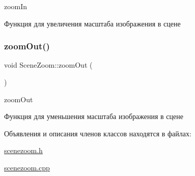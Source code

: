 zoom\+In 

Функция для увеличения масштаба изображения в сцене \mbox{\label{classSceneZoom_a9907761406dc1a9f1664429b4004a592}} 
\subsubsection{\texorpdfstring{zoom\+Out()}{zoomOut()}}
{\footnotesize\ttfamily void Scene\+Zoom\+::zoom\+Out (\begin{DoxyParamCaption}{ }\end{DoxyParamCaption})}



zoom\+Out 

Функция для уменьшения масштаба изображения в сцене 

Объявления и описания членов классов находятся в файлах\+:\begin{DoxyCompactItemize}
\item 
\hyperlink{scenezoom_8h}{scenezoom.\+h}\item 
\hyperlink{scenezoom_8cpp}{scenezoom.\+cpp}\end{DoxyCompactItemize}

